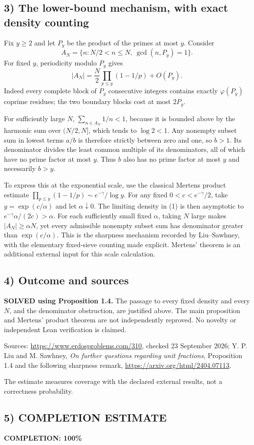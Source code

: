 \subsection*{3) The lower-bound mechanism, with exact density counting}
Fix $y\ge2$ and let $P_y$ be the product of the primes at most $y$. Consider
\[
 A_N=\{n:N/2<n\le N,\ \gcd(n,P_y)=1\}.
\]
For fixed $y$, periodicity modulo $P_y$ gives
\[
 |A_N|=\frac N2\prod_{p\le y}(1-1/p)+O(P_y).\tag{1}
\]
Indeed every complete block of $P_y$ consecutive integers contains exactly $\varphi(P_y)$ coprime residues; the two boundary blocks cost at most $2P_y$.

For sufficiently large $N$, $\sum_{n\in A_N}1/n<1$, because it is bounded above by the harmonic sum over $(N/2,N]$, which tends to $\log2<1$. Any nonempty subset sum in lowest terms $a/b$ is therefore strictly between zero and one, so $b>1$. Its denominator divides the least common multiple of its denominators, all of which have no prime factor at most $y$. Thus $b$ also has no prime factor at most $y$ and necessarily $b>y$.

To express this at the exponential scale, use the classical Mertens product estimate $\prod_{p\le y}(1-1/p)\sim e^{-\gamma}/\log y$. For any fixed $0<c<e^{-\gamma}/2$, take $y=\exp(c/\alpha)$ and let $\alpha\downarrow0$. The limiting density in (1) is then asymptotic to $e^{-\gamma}\alpha/(2c)>\alpha$. For each sufficiently small fixed $\alpha$, taking $N$ large makes $|A_N|\ge\alpha N$, yet every admissible nonempty subset sum has denominator greater than $\exp(c/\alpha)$. This is the sharpness mechanism recorded by Liu--Sawhney, with the elementary fixed-sieve counting made explicit. Mertens' theorem is an additional external input for this scale calculation.

\subsection*{4) Outcome and sources}
\textbf{SOLVED using Proposition 1.4.} The passage to every fixed density and every $N$, and the denominator obstruction, are justified above. The main proposition and Mertens' product theorem are not independently reproved. No novelty or independent Lean verification is claimed.

Sources: \url{https://www.erdosproblems.com/310}, checked 23 September 2026; Y. P. Liu and M. Sawhney, \emph{On further questions regarding unit fractions}, Proposition 1.4 and the following sharpness remark, \url{https://arxiv.org/html/2404.07113}.

The estimate measures coverage with the declared external results, not a correctness probability.
\subsection*{5) COMPLETION ESTIMATE}
\textbf{COMPLETION: 100\%}
